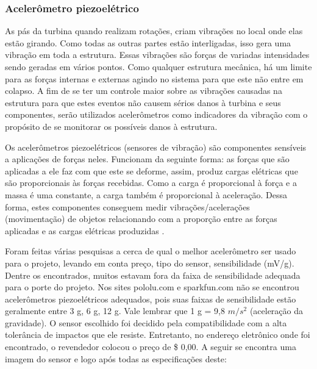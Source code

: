 \subsubsection{Acelerômetro piezoelétrico}

  As pás da turbina quando realizam rotações, criam vibrações no local onde elas estão girando. Como todas as outras partes
  estão interligadas, isso gera uma vibração em toda a estrutura. Essas vibrações são forças de variadas intensidades sendo
  geradas em vários pontos. Como qualquer estrutura mecânica, há um limite para as forças internas e externas agindo no sistema
  para que este não entre em colapso. A fim de se ter um controle maior sobre as vibrações causadas na estrutura para que
  estes eventos não causem sérios danos à turbina e seus componentes, serão utilizados acelerômetros como indicadores da
  vibração com o propósito de se monitorar os possíveis danos à estrutura.
  
  Os acelerômetros piezoelétricos (sensores de vibração) são componentes sensíveis a aplicações de forças neles. Funcionam da
  seguinte forma: as forças que são aplicadas a ele faz com que este se deforme, assim, produz cargas elétricas que são
  proporcionais às forças recebidas. Como a carga é proporcional à força e a massa é uma constante, a carga também é proporcional
  à aceleração. Dessa forma, estes componentes conseguem medir vibrações/acelerações (movimentação) de objetos relacionando com
  a proporção entre as forças aplicadas e as cargas elétricas produzidas \footnotemark.
  
  Foram feitas várias pesquisas a cerca de qual o melhor acelerômetro ser usado para o projeto, levando em conta preço, tipo do
  sensor, sensibilidade (mV/g). Dentre os encontrados, muitos estavam fora da faixa de sensibilidade adequada para o porte do
  projeto. Nos sites pololu.com \footnotemark {} e
  sparkfun.com \footnotemark {} não se encontrou acelerômetros piezoelétricos adequados, pois suas faixas
  de sensibilidade estão geralmente entre 3 g, 6 g, 12 g. Vale lembrar que 1 g = 9,8 $m/s^2$ (aceleração da gravidade). O sensor 
  escolhido foi decidido pela compatibilidade com a alta tolerância de impactos que ele resiste. Entretanto, no endereço 
  eletrônico \footnotemark {} onde foi encontrado, o revendedor colocou o preço de \$ 0,00. A seguir se encontra uma imagem do
  sensor e logo após todas as especificações deste:
  
